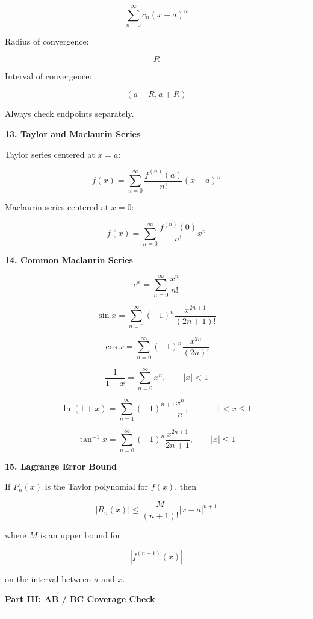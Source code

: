 \documentclass[11pt]{article}
\newcommand{\sectiontitle}[1]{
\vspace{0.8em}
{\Large\textcolor{novelPurpleDark}{\textbf{#1}}}
\vspace{0.35em}
\hrule
\vspace{0.8em}
}
\newcommand{\subtopic}[1]{
\vspace{0.45em}
\textcolor{novelPurpleDark}{\textbf{#1}}
}
\begin{document}
\[
\sum_{n=0}^{\infty}c_n(x-a)^n
\]

Radius of convergence:

\[
R
\]

Interval of convergence:

\[
(a-R,a+R)
\]

Always check endpoints separately.

\subtopic{13. Taylor and Maclaurin Series}

Taylor series centered at \(x=a\):

\[
f(x)=\sum_{n=0}^{\infty}\frac{f^{(n)}(a)}{n!}(x-a)^n
\]

Maclaurin series centered at \(x=0\):

\[
f(x)=\sum_{n=0}^{\infty}\frac{f^{(n)}(0)}{n!}x^n
\]

\subtopic{14. Common Maclaurin Series}

\[
e^x=\sum_{n=0}^{\infty}\frac{x^n}{n!}
\]

\[
\sin x=\sum_{n=0}^{\infty}(-1)^n\frac{x^{2n+1}}{(2n+1)!}
\]

\[
\cos x=\sum_{n=0}^{\infty}(-1)^n\frac{x^{2n}}{(2n)!}
\]

\[
\frac1{1-x}=\sum_{n=0}^{\infty}x^n,\qquad |x|<1
\]

\[
\ln(1+x)=\sum_{n=1}^{\infty}(-1)^{n+1}\frac{x^n}{n},\qquad -1<x\le1
\]

\[
\tan^{-1}x=\sum_{n=0}^{\infty}(-1)^n\frac{x^{2n+1}}{2n+1},\qquad |x|\le1
\]

\subtopic{15. Lagrange Error Bound}

If \(P_n(x)\) is the Taylor polynomial for \(f(x)\), then

\[
|R_n(x)|\le \frac{M}{(n+1)!}|x-a|^{n+1}
\]

where \(M\) is an upper bound for

\[
|f^{(n+1)}(x)|
\]

on the interval between \(a\) and \(x\).

\newpage


\sectiontitle{Part III: AB / BC Coverage Check}
\end{document}
